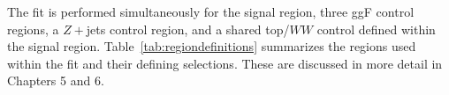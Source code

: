 The fit is performed simultaneously for the signal region, three ggF control regions, a $Z+$jets control region, and a shared top/$WW$ control defined within the signal region. Table~\ref{tab:regiondefinitions} summarizes the regions used within the fit and their defining selections. These are discussed in more detail in Chapters 5 and 6. 

\begin{table}[h!]
\begin{center}
\end{center}
\caption{Summary of all signal and control regions included in simultaneous fit}
\label{tab:regiondefinitions}
\end{table}

